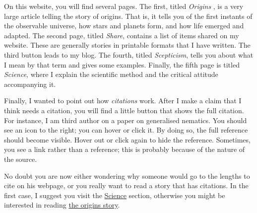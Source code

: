 \begin{multicols}{2}
On this website, you will find several pages. The first, titled \emph{ Origins }, is a very large article telling the story of origins.
That is, it tells you of the first instants of the observable universe, how stars and planets form, and how life emerged and adapted. The
second page, titled \emph{Share}, contains a list of items shared on my website. These are generally stories in printable formats that I
have written. The third button leads to my blog. The fourth, titled \emph{Scepticism}, tells you about what I mean by that term and gives
some examples. Finally, the fifth page is titled \emph{Science}, where I explain the scientific method and the critical attitude accompanying
it.

Finally, I wanted to point out how \emph{citations} work. After I make a claim that I think needs a citation, you will find a little button
that shows the full citation. For instance, I am third author on a paper on generalised nematics. You should see an icon to the right;
you can hover or click it. By doing so, the full reference should become visible. Hover out or click again to hide the reference. Sometimes, you
see a link rather than a reference; this is probably because of the nature of the source.

No doubt you are now either wondering why someone would go to the lengths to cite on his webpage, or you really want to read a story that has
citations. In the first case, I suggest you visit the \href{./science}{Science} section, otherwise you might be interested in reading
\href{./origins}{the origins story}.
\end{multicols}